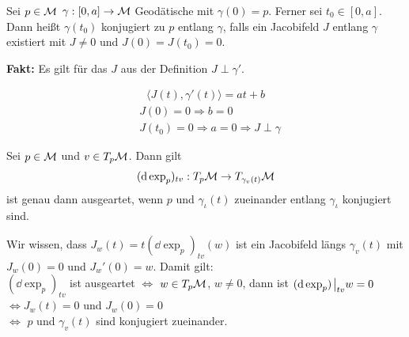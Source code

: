 \begin{defs}
Sei $p\in\mathcal{M}$ $\gamma : [ 0,a] \to\mathcal{M}$ Geodätische mit $\gamma (0) = p$.
Ferner sei $t_0\in [0,a]$.
Dann heißt $\gamma (t_0)$ konjugiert zu $p$ entlang $\gamma$,
falls ein Jacobifeld $J$ entlang $\gamma$ existiert mit 
$J\neq 0$ und $J(0) = J(t_0)=0$.
\end{defs}
\textbf{Fakt:}
Es gilt für das $J$ aus der Definition $J \perp \gamma'$.

\begin{bew}
\begin{align*}
    \langle J(t) , \gamma'(t) \rangle = at + b
\end{align*}
\begin{align*}
    &J(0)=0 \Rightarrow b=0\\
    &J(t_0) = 0 \Rightarrow a = 0 \Rightarrow J \perp \gamma
\end{align*}

\end{bew}


\begin{lem}
    Sei $p\in\mathcal{M}$ und $v\in T_p\mathcal{M}$.
    Dann gilt
    \begin{align*}
        (\dd \exp_p)_{tv}: T_p\mathcal{M} \to T_{\gamma_v (t)} \mathcal{M}
    \end{align*}
    ist genau dann ausgeartet, wenn $p$ und $\gamma_\iota (t)$
    zueinander entlang $\gamma_\iota$ konjugiert sind.
\end{lem}

\begin{bew}
    Wir wissen, dass $J_w (t) = t (\dd \exp_p)_{tv} (w)$ ist ein Jacobifeld längs $\gamma_v (t)$ mit $J_w (0)=0$
    und $J_w ' (0) = w$.
    Damit gilt:\\
    $(\dd \exp_{p})_{tv}$ ist ausgeartet $\Leftrightarrow$ $w\in T_p\mathcal{M}$, $w\neq 0$,
    dann ist $(\dd \exp_p)\eval_{tv} w= 0$\\
    $\Leftrightarrow J_w(t)=0$ und $J_w(0)=0$\\
    $\Leftrightarrow$ $p$ und $\gamma_v(t)$ sind konjugiert zueinander.
\end{bew}


